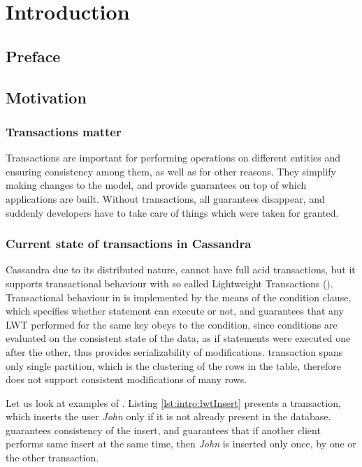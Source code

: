 
\chapter{Introduction}\label{chapter:introduction}

\section{Preface}\label{sec:introduction:preface}

\section{Motivation}\label{sec:introduction:motivation}

\subsection{Transactions matter}

Transactions are important for performing operations on different entities and ensuring consistency among them, as well as for other reasons. They simplify making changes to the model, and provide guarantees on top of which applications are built. Without transactions, all guarantees disappear, and suddenly developers have to take care of things which were taken for granted.

\subsection{Current state of transactions in Cassandra}	
Cassandra due to its distributed nature, cannot have full acid transactions, but it supports transactional behaviour with so called Lightweight Transactions (\lwt).
Transactional behaviour in \lwt is implemented by the means of the condition clause, which specifies whether statement can execute or not, and guarantees that any LWT performed for the same key obeys to the condition, since conditions are evaluated on the consistent state of the data, as if statements were executed one after the other, thus provides serializability of modifications. \lwt transaction spans only single partition, which is the clustering of the rows in the table, therefore \lwt does not support consistent modifications of many rows.

Let us look at examples of \lwt. Listing \ref{lst:intro:lwtInsert} presents a transaction, which inserts the user \emph{John} only if it is not already present in the database. \lwt guarantees consistency of the insert, and guarantees that if another client performs same insert at the same time, then \emph{John} is inserted only once, by one or the other transaction.

